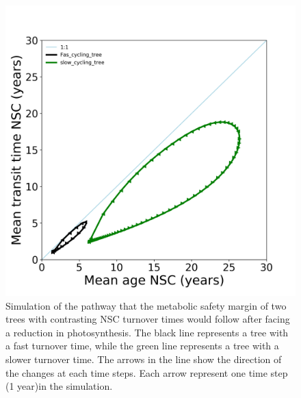 \documentclass{article}
\begin{document}
 
\begin{figure}[h] %
   \centering
   \includegraphics[width=5in]{income_reduction.png} 
   \caption{Simulation of the pathway that the metabolic safety margin of two trees with contrasting NSC turnover times would follow after facing a reduction in photosynthesis. The black line represents a tree with a fast turnover time, while the green line represents a tree with a slower turnover time. The arrows in the line show the direction of the changes at each time steps. Each arrow represent one time step (1 year)in the simulation.}
   \label{fig:income_reduction}
\end{figure}
\end{document}
